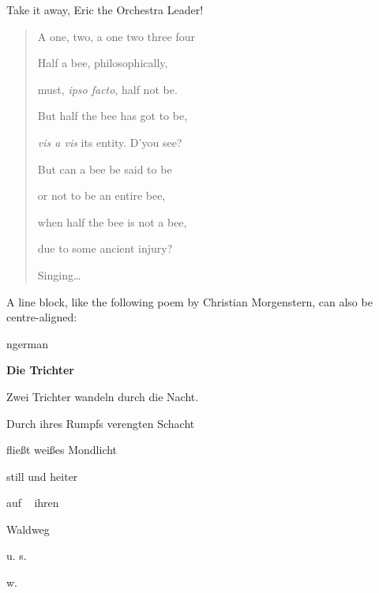 \documentclass[a4paper]{article}
\newenvironment{DUlineblock}[1]{%
    \list{}{\setlength{\partopsep}{\parskip}
            \addtolength{\partopsep}{\baselineskip}
            \setlength{\topsep}{0pt}
            \setlength{\itemsep}{0.15\baselineskip}
            \setlength{\parsep}{0pt}
            \setlength{\leftmargin}{#1}}
    \raggedright
  }
  {\endlist}
\begin{document}
Take it away, Eric the Orchestra Leader!

\begin{quote}
\begin{DUlineblock}{0em}
\item[] A one, two, a one two three four
\item[] 
\item[] Half a bee, philosophically,
\item[]
\begin{DUlineblock}{\DUlineblockindent}
\item[] must, \emph{ipso facto}, half not be.
\end{DUlineblock}
\item[] But half the bee has got to be,
\item[]
\begin{DUlineblock}{\DUlineblockindent}
\item[] \emph{vis a vis} its entity.  D’you see?
\item[] 
\end{DUlineblock}
\item[] But can a bee be said to be
\item[]
\begin{DUlineblock}{\DUlineblockindent}
\item[] or not to be an entire bee,
\item[]
\begin{DUlineblock}{\DUlineblockindent}
\item[] when half the bee is not a bee,
\item[]
\begin{DUlineblock}{\DUlineblockindent}
\item[] due to some ancient injury?
\item[] 
\end{DUlineblock}
\end{DUlineblock}
\end{DUlineblock}
\item[] Singing…
\end{DUlineblock}
\end{quote}

A line block, like the following poem by Christian Morgenstern, can
also be centre-aligned:

\begin{selectlanguage}{ngerman}
\begin{DUlineblock}{0em}
\centering
\item[] \textbf{Die Trichter}
\item[] 
\item[] Zwei Trichter wandeln durch die Nacht.
\item[] Durch ihres Rumpfs verengten Schacht
\item[] fließt weißes Mondlicht
\item[] still und heiter
\item[] auf   ihren
\item[] Waldweg
\item[] u. s.
\item[] w.
\item[] 
\end{DUlineblock}
\end{selectlanguage}
\end{document}
